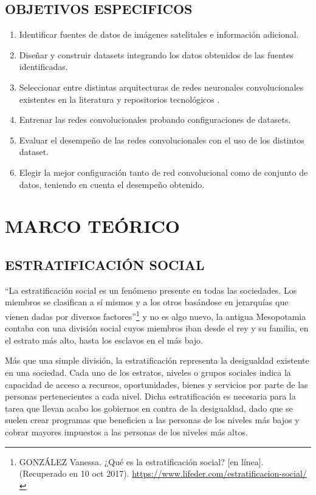     \section{OBJETIVOS ESPECIFICOS}
    \begin{enumerate}
      \item Identificar fuentes de datos de imágenes satelitales e información adicional.
      \item Diseñar y construir datasets integrando los datos obtenidos de las fuentes identificadas.
      \item Seleccionar entre distintas arquitecturas de redes neuronales convolucionales existentes en la literatura y repositorios tecnológicos    .
      \item Entrenar las redes convolucionales probando configuraciones de datasets.
      \item Evaluar el desempeño de las redes convolucionales con el uso de los distintos dataset. 
      \item Elegir la mejor configuración tanto de red convolucional como de conjunto de datos, teniendo en cuenta el desempeño obtenido.   
    \end{enumerate}

    \newpage\chapter{MARCO TEÓRICO}     
    
	\section{ESTRATIFICACIÓN SOCIAL}
    
    “La estratificación social es un fenómeno presente en todas las sociedades. Los miembros se clasifican a sí mismos y a los otros basándose en jerarquías que vienen dadas por diversos factores”\footnote[8]{GONZÁLEZ Vanessa. ¿Qué es la estratificación social? [en línea]. (Recuperado en 10 oct 2017). \url{https://www.lifeder.com/estratificacion-social/}} y no es algo nuevo, la antigua Mesopotamia contaba con una división social cuyos miembros iban desde el rey y su familia, en el estrato más alto, hasta los esclavos en el más bajo.
    
    Más que una simple división, la estratificación representa la desigualdad existente en una sociedad. Cada uno de los estratos, niveles o grupos sociales indica la capacidad de acceso a recursos, oportunidades, bienes y servicios por parte de las personas pertenecientes a cada nivel. Dicha estratificación es necesaria para la tarea que llevan acabo los gobiernos en contra de la desigualdad, dado que se suelen crear programas que beneficien a las personas de los niveles más bajos y cobrar mayores impuestos a las personas de los niveles más altos.
    
